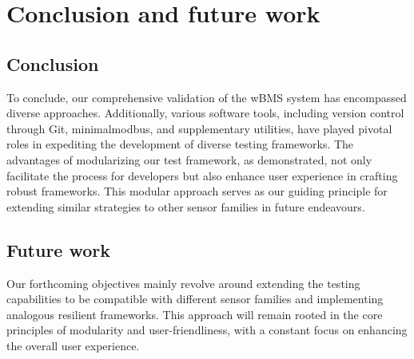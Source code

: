 \chapter{Conclusion and future work} %

\label{ch:future}


\section{Conclusion}
To conclude, our comprehensive validation of the wBMS system has encompassed diverse approaches. Additionally, various software tools, including version control through Git, minimalmodbus, and supplementary utilities, have played pivotal roles in expediting the development of diverse testing frameworks. The advantages of modularizing our test framework, as demonstrated, not only facilitate the process for developers but also enhance user experience in crafting robust frameworks. This modular approach serves as our guiding principle for extending similar strategies to other sensor families in future endeavours.


\section{Future work}

Our forthcoming objectives mainly revolve around extending the testing capabilities to be compatible with different sensor families and implementing analogous resilient frameworks. This approach will remain rooted in the core principles of modularity and user-friendliness, with a constant focus on enhancing the overall user experience.